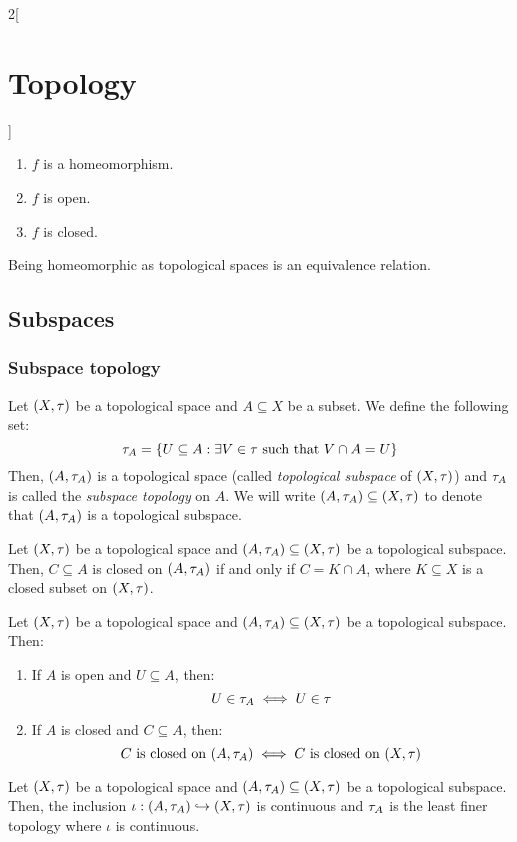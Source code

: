 \documentclass[../../../main.tex]{subfiles}
\begin{document}
\begin{multicols}{2}[\section{Topology}]
\begin{proposition}
    \begin{enumerate}
      \item $f$ is a homeomorphism.
      \item $f$ is open.
      \item $f$ is closed.
    \end{enumerate}
  \end{proposition}
  \begin{proposition}
    Being homeomorphic as topological spaces is an equivalence relation.
  \end{proposition}
  \subsection{Subspaces}
  \subsubsection{Subspace topology}
  \begin{definition}
    Let $(X,\tau)$ be a topological space and $A\subseteq X$ be a subset. We define the following set: $$\tau_A=\{U\subseteq A:\exists V\in\tau\text{ such that }V\cap A=U\}$$ Then, $(A,\tau_A)$ is a topological space (called \emph{topological subspace} of $(X,\tau)$) and $\tau_A$ is called the \emph{subspace topology} on $A$. We will write $(A,\tau_A)\subseteq (X,\tau)$ to denote that $(A,\tau_A)$ is a topological subspace.
  \end{definition}
  \begin{proposition}
    Let $(X,\tau)$ be a topological space and $(A,\tau_A)\subseteq (X,\tau)$ be a topological subspace. Then, $C\subseteq A$ is closed on $(A,\tau_A)$ if and only if $C=K\cap A$, where $K\subseteq X$ is a closed subset on $(X,\tau)$.
  \end{proposition}
  \begin{proposition}
    Let $(X,\tau)$ be a topological space and $(A,\tau_A)\subseteq (X,\tau)$ be a topological subspace. Then:
    \begin{enumerate}
      \item If $A$ is open and $U\subseteq A$, then: $$U\in\tau_A\iff U\in\tau$$
      \item If $A$ is closed and $C\subseteq A$, then: $$C\text{ is closed on }(A,\tau_A)\iff C\text{ is closed on }(X,\tau)$$
    \end{enumerate}
  \end{proposition}
  \begin{proposition}
    Let $(X,\tau)$ be a topological space and $(A,\tau_A)\subseteq (X,\tau)$ be a topological subspace. Then, the inclusion $\iota:(A,\tau_A)\hookrightarrow (X,\tau)$ is continuous and $\tau_A$ is the least finer topology where $\iota$ is continuous.

\end{proposition}
\end{multicols}
\end{document}
